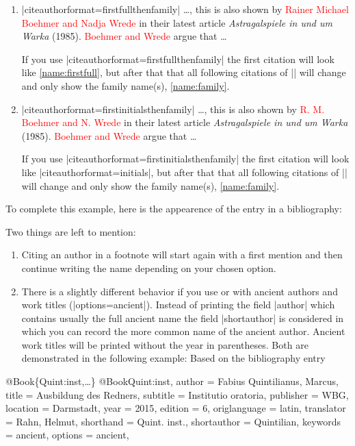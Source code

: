 \documentclass[a4paper,
10pt,
greek,
french,
spanish,
italian,
ngerman,
english,
]{ltxdoc}
\begin{document}
\begin{refsection}
\begin{enumerate}
\item\label{name:firstfulltheninitials}
\begin{tcolorbox}[examplebox]
 |citeauthorformat=firstfullthenfamily|
 \tcblower
\ldots , this is also shown by \textcolor{red}{Rainer Michael Boehmer  and Nadja Wrede} in their latest article \emph{Astragalspiele in und um Warka} (1985). 
\textcolor{red}{Boehmer  and Wrede} argue that \ldots
\end{tcolorbox}
 If you use |citeauthorformat=firstfullthenfamily| the first citation will look like \ref{name:firstfull}, but after that that all following citations of |\citeauthor{Boehmer1985}| will change and only show the family name(s), \ref{name:family}.


\item\label{name:firstinitialsthenfamily}
\begin{tcolorbox}[examplebox]
 |citeauthorformat=firstinitialsthenfamily|
 \tcblower
\ldots , this is also shown by \textcolor{red}{R. M. Boehmer  and N. Wrede} in their latest article \emph{Astragalspiele in und um Warka} (1985). 
\textcolor{red}{Boehmer  and Wrede} argue that \ldots
\end{tcolorbox}

 If you use |citeauthorformat=firstinitialsthenfamily| the first citation will look like |citeauthorformat=initials|, but after that that all following citations of |\citeauthor{Boehmer1985}| will change and only show the family name(s), \ref{name:family}.
\end{enumerate}
\end{refsection}

To complete this example,
here is the appearence of the entry in a bibliography:


Two things are left to mention: 
\begin{enumerate}
\item Citing an author in a footnote will start again with a first mention and then continue writing the name depending on your chosen option.

\item There is a slightly different behavior if you use   or   with ancient authors and work titles (|options={ancient}|).
Instead of printing the field |author| which contains usually the full ancient name the field |shortauthor| is considered in which you can record the more common name of the ancient author.
Ancient work titles will be printed without the year in parentheses. 
Both are demonstrated in the following example: Based on the bibliography entry
\end{enumerate}
\begin{bibexample}[label=Quint:inst]{{@}Book\{Quint:inst,…\}}
@Book{Quint:inst,
  author       = {Fabius Quintilianus, Marcus},
  title        = {Ausbildung des Redners},
  subtitle     = {Institutio oratoria},
  publisher    = WBG,
  location     = {Darmstadt},
  year         = {2015},
  edition      = {6},
  origlanguage = {latin},
  translator   = {Rahn, Helmut},
  shorthand    = {Quint. inst.},
  shortauthor  = {Quintilian},
  keywords     = {ancient},
  options      = {ancient},
}
\end{bibexample}
\end{document}
